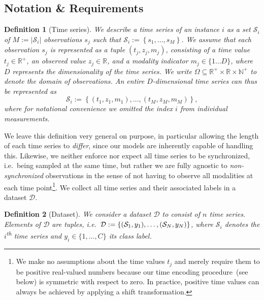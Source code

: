 \documentclass{article}
\renewcommand{\natural}{\mathds{N}\xspace}
\newcommand{\real}     {\mathds{R}\xspace}
\renewcommand{\th}{\textsuperscript{\textup{th}}\xspace}
\newtheorem{definition}{Definition}
\begin{document}
\subsection{Notation \& Requirements}


\begin{definition}[Time series]
  We describe a time series of an instance $i$ as a set $\mathcal{S}_i$
  of $M := |\mathcal{S}_i|$ observations
  $s_j$ such that $\mathcal{S}_i := \left\{s_1, \dots, s_M \right\} $.
We assume that each observation $s_j$ is represented as a tuple
  $\left(t_j, z_j, m_j \right)$, consisting of a time value $t_j \in \real^{+}$,
  an observed value $z_j \in \real$,
  and a modality indicator $m_j \in \{1 \dots D\}$, where $D$ represents the dimensionality
  of the time series.
We write $\Omega \subseteq \real^{+} \times \real \times \natural^{+}$
  to denote the domain of observations.
An entire $D$-dimensional time series can thus be represented as
\begin{equation}
    \mathcal{S}_i := \left\{\left(t_{1}, z_{1}, m_{1}\right), \dots, \left(t_{M}, z_{M}, m_{M}\right)\right\},
  \end{equation}
where for notational convenience we omitted the index $i$ from
  individual measurements.
\label{def:Time series}
\end{definition}
We leave this definition very general on purpose, in particular allowing
the length of each time series to \emph{differ}, since our models are
inherently capable of handling this.
Likewise, we neither enforce
nor expect all time series to be synchronized, i.e.\ being sampled at
the same time, but rather we are fully agnostic to \emph{non-synchronized}
observations in the sense of not having to observe all modalities at
each time point\footnote{We make no assumptions about the time values
$t_j$ and merely require them to be positive real-valued numbers because
our time encoding procedure~(see below) is symmetric with respect to
zero. In practice, positive time values can always be achieved by
applying a shift transformation.}.
We collect all time series and their associated labels in a dataset
$\mathcal{D}$.
\begin{definition}[Dataset]
  We consider a dataset $\mathcal{D}$ to consist of $n$ time series.
  Elements of $\mathcal{D}$ are tuples, i.e.\
  $ \mathcal{D} := \mleft\{\mleft(\mathcal{S}_1, y_1\mright), \dots, \mleft(\mathcal{S}_N,
  y_N\mright)\mright\}$, where $\mathcal{S}_i$ denotes the $i$\th time
  series and $y_i \in \{1, \dots, C\}$ its class label.
  \label{def:Dataset}
\end{definition}
\end{document}

